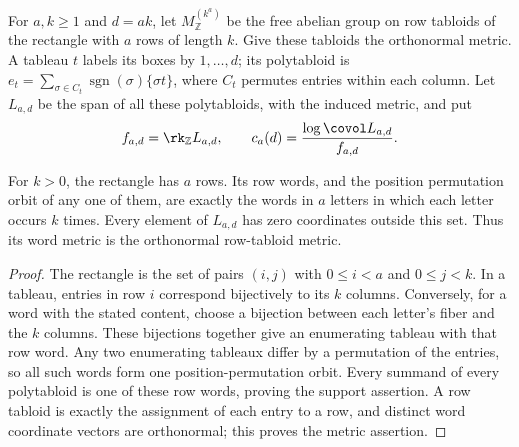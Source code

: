 \begin{definition}
\label{def:rectangular-specht}
\leanok
For $a,k\geq1$ and $d=ak$, let $M^{(k^a)}_\mathbb Z$ be the free
abelian group on row tabloids of the rectangle with $a$ rows of length
$k$. Give these tabloids the orthonormal metric. A tableau $t$ labels
its boxes by $1,\ldots,d$; its polytabloid is
$e_t=\sum_{\sigma\in C_t}\operatorname{sgn}(\sigma)\{\sigma t\}$,
where $C_t$ permutes entries within each column. Let $L_{a,d}$ be the
span of all these polytabloids, with the induced metric, and put
\[
 f_{a,d}=\rk_\mathbb Z L_{a,d},\qquad
 c_a(d)=\frac{\log\covol L_{a,d}}{f_{a,d}}.
\]
\end{definition}

\begin{lemma}
\label{lem:rectangular-row-words}
\leanok
For $k>0$, the rectangle has $a$ rows. Its row words, and the position
permutation orbit of any one of them, are exactly the words in $a$
letters in which each letter occurs $k$ times. Every element of
$L_{a,d}$ has zero coordinates outside this set. Thus its word metric
is the orthonormal row-tabloid metric.
\end{lemma}
\begin{proof}
The rectangle is the set of pairs $(i,j)$ with $0\leq i<a$ and
$0\leq j<k$. In a tableau, entries in row $i$ correspond bijectively
to its $k$ columns. Conversely, for a word with the stated content,
choose a bijection between each letter's fiber and the $k$ columns.
These bijections together give an enumerating tableau with that row
word. Any two enumerating tableaux differ by a permutation of the
entries, so all such words form one position-permutation orbit.
Every summand of every polytabloid is one of these row words, proving
the support assertion. A row tabloid is exactly the assignment of
each entry to a row, and distinct word coordinate vectors are
orthonormal; this proves the metric assertion.
\end{proof}

